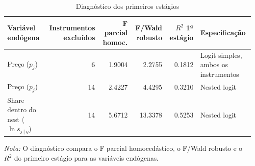 

\begingroup
\begin{table}[H]
\centering
\caption{Diagnóstico dos primeiros estágios}
\label{tab:first-stage-diagnostics}
\scriptsize
\setlength{\tabcolsep}{4pt}
\renewcommand{\arraystretch}{1.08}
\begin{tabular}{@{}p{}rrrrp{}@{}}
\toprule
Variável endógena & Instrumentos excluídos & F parcial homoc. & F/Wald robusto & $R^2$ 1º estágio & Especificação \\
\midrule
Preço ($p_j$) & 6 & 1.9004 & 2.2755 & 0.1812 & Logit simples, ambos os instrumentos \\
Preço ($p_j$) & 14 & 2.4227 & 4.4295 & 0.3210 & Nested logit \\
Share dentro do nest ($\ln s_{j\mid g}$) & 14 & 5.6712 & 13.3378 & 0.5253 & Nested logit \\
\bottomrule
\end{tabular}

\vspace{0.3em}
\footnotesize
\textit{Nota:} O diagnóstico compara o F parcial homocedástico, o F/Wald robusto e o $R^2$ do primeiro estágio para as variáveis endógenas.
\end{table}
\endgroup